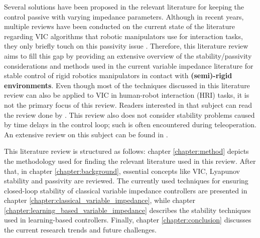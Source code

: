 
Several solutions have been proposed in the relevant literature for keeping the control passive with varying impedance parameters. Although in recent years, multiple reviews have been conducted on the current state of the literature regarding VIC algorithms that robotic manipulators use for interaction tasks, they only briefly touch on this passivity issue \cite{suomalainenSurveyRobotManipulation2021,songTutorialSurveyComparison2019,abu-dakkaVariableImpedanceControl2020,al-shukaActiveImpedanceControl2018}. Therefore, this literature review aims to fill this gap by providing an extensive overview of the stability/passivity considerations and methods used in the current variable impedance literature for stable control of rigid robotics manipulators in contact with \textbf{(semi)-rigid environments}. Even though most of the techniques discussed in this literature review can also be applied to VIC in human-robot interaction (HRI) tasks, it is not the primary focus of this review. Readers interested in that subject can read the review done by \cite{sharifiImpedanceVariationLearning2021}. This review also does not consider stability problems caused by time delays in the control loop; such is often encountered during teleoperation. An extensive review on this subject can be found in \cite{farajiparvarBriefSurveyTelerobotic2020}.

This literature review is structured as follows: chapter \ref{chapter:method} depicts the methodology used for finding the relevant literature used in this review. After that, in chapter \ref{chapter:background}, essential concepts like VIC, Lyapunov stability and passivity are reviewed. The currently used techniques for ensuring closed-loop stability of classical variable impedance controllers are presented in chapter \ref{chapter:classical_variable_impedance}, while chapter \ref{chapter:learning_based_variable_impedance} describes the stability techniques used in learning-based controllers. Finally, chapter \ref{chapter:conclusion} discusses the current research trends and future challenges.
